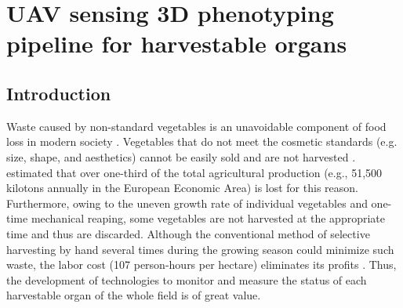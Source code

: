 \chapter{UAV sensing 3D phenotyping pipeline for harvestable organs}

% 

\section{Introduction}

Waste caused by non-standard vegetables is an unavoidable component of food loss in modern society \citep{parfitt_food_2010,teuber_food_2016}. Vegetables that do not meet the cosmetic standards (e.g. size, shape, and aesthetics) cannot be easily sold and are not harvested \citep{garrone_opening_2014}. \citet{porter_avoidable_2018} estimated that over one-third of the total agricultural production (e.g., 51,500 kilotons annually in the European Economic Area) is lost for this reason. Furthermore, owing to the uneven growth rate of individual vegetables and one-time mechanical reaping, some vegetables are not harvested at the appropriate time and thus are discarded. Although the conventional method of selective harvesting by hand several times during the growing season could minimize such waste, the labor cost (107 person-hours per hectare) eliminates its profits \citep{blok_effect_2021}. Thus, the development of technologies to monitor and measure the status of each harvestable organ of the whole field is of great value.



